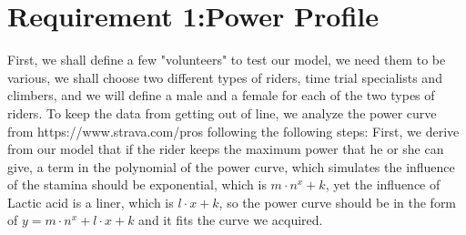\documentclass[12pt]{article}
\begin{document}
\section{Requirement 1:Power Profile}
First, we shall define a few "volunteers" to test our model, we need them to be various, we shall choose two different types of riders, time trial
specialists and climbers, and we will define a male and a female for each of the two types of riders. %
To keep the data from getting out of line, we analyze the power curve
from https://www.strava.com/pros following the following steps:
First, we derive from our model that if the rider keeps the maximum power that he or she can give, a term in the polynomial of the power curve,  which simulates the influence of the stamina should be exponential,
which is $m\cdot n^x+k$, yet the influence of Lactic acid is a liner, which is $l\cdot x+k$, so the power curve should be in the form of $y=m\cdot n^x+l\cdot x+k$
and it fits the curve we acquired.
\end{document}
